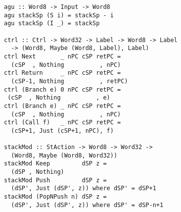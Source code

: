 \documentclass[preprint]{sigplanconf}
\begin{document}
\begin{lstlisting}
agu :: Word8 -> Input -> Word8
agu stackSp (S i) = stackSp - i
agu stackSp (I _) = stackSp

ctrl :: Ctrl -> Word32 -> Label -> Word8 -> Label
  -> (Word8, Maybe (Word8, Label), Label)
ctrl Next       _ nPC cSP retPC =
  (cSP  , Nothing          , nPC)
ctrl Return     _ nPC cSP retPC =
  (cSP-1, Nothing          , retPC)
ctrl (Branch e) 0 nPC cSP retPC =
 (cSP  , Nothing          , e)
ctrl (Branch e) _ nPC cSP retPC =
  (cSP  , Nothing          , nPC)
ctrl (Call f)   _ nPC cSP retPC =
  (cSP+1, Just (cSP+1, nPC), f)

stackMod :: StAction -> Word8 -> Word32 ->
  (Word8, Maybe (Word8, Word32))
stackMod Keep         dSP z =
  (dSP , Nothing)
stackMod Push         dSP z =
  (dSP', Just (dSP', z)) where dSP' = dSP+1
stackMod (PopNPush n) dSP z =
  (dSP', Just (dSP', z)) where dSP' = dSP-n+1
\end{lstlisting}
\end{document}
